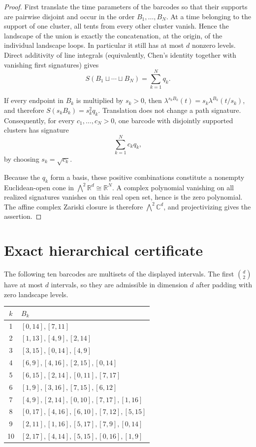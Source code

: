 \documentclass[11pt]{article}
\newcommand{\R}{\mathbb R}
\newcommand{\C}{\mathbb C}
\newcommand{\wedgec}{\bigwedge\nolimits^{2}}
\begin{document}
\begin{proof}
First translate the time parameters of the barcodes so that their supports are pairwise disjoint and occur in the order $B_1,\ldots,B_N$.  At a time belonging to the support of one cluster, all tents from every other cluster vanish.  Hence the landscape of the union is exactly the concatenation, at the origin, of the individual landscape loops.  In particular it still has at most $d$ nonzero levels.  Direct additivity of line integrals (equivalently, Chen's identity together with vanishing first signatures) gives
\[
 S(B_1\sqcup\cdots\sqcup B_N)=\sum_{k=1}^N q_k.
\]

If every endpoint in $B_k$ is multiplied by $s_k>0$, then
$\lambda^{s_kB_k}(t)=s_k\lambda^{B_k}(t/s_k)$, and therefore
$S(s_kB_k)=s_k^2q_k$.  Translation does not change a path signature.  Consequently, for every $c_1,\ldots,c_N>0$, one barcode with disjointly supported clusters has signature
\[
 \sum_{k=1}^N c_kq_k,
\]
by choosing $s_k=\sqrt{c_k}$.

Because the $q_k$ form a basis, these positive combinations constitute a nonempty Euclidean-open cone in $\wedgec\R^d\cong\R^N$.  A complex polynomial vanishing on all realized signatures vanishes on this real open set, hence is the zero polynomial.  The affine complex Zariski closure is therefore $\wedgec\C^d$, and projectivizing gives the assertion.
\end{proof}

\section{Exact hierarchical certificate}

The following ten barcodes are multisets of the displayed intervals.  The first
$\binom d2$ have at most $d$ intervals, so they are admissible in dimension $d$ after padding with zero landscape levels.
\begin{center}
\small
\renewcommand{\arraystretch}{1.12}
\begin{tabular}{c@{\quad}l}
\toprule
$k$ & $B_k$ \\
\midrule
1 & $[0,14],[7,11]$\\
2 & $[1,13],[4,9],[2,14]$\\
3 & $[3,15],[0,14],[4,9]$\\
4 & $[6,9],[4,16],[2,15],[0,14]$\\
5 & $[6,15],[2,14],[0,11],[7,17]$\\
6 & $[1,9],[3,16],[7,15],[6,12]$\\
7 & $[4,9],[2,14],[0,10],[7,17],[1,16]$\\
8 & $[0,17],[4,16],[6,10],[7,12],[5,15]$\\
9 & $[2,11],[1,16],[5,17],[7,9],[0,14]$\\
10 & $[2,17],[4,14],[5,15],[0,16],[1,9]$\\
\bottomrule
\end{tabular}
\end{center}
\end{document}
